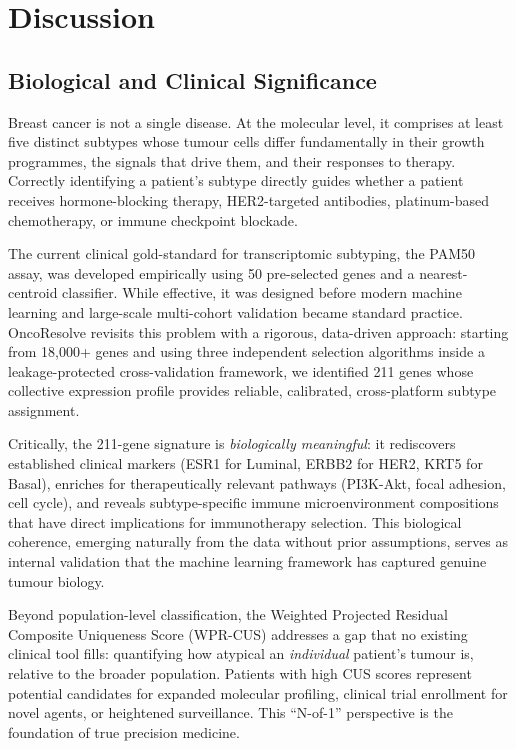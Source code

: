 \documentclass[10pt,a4paper,twocolumn]{article}
\begin{document}
\section{Discussion}

\subsection{Biological and Clinical Significance}

Breast cancer is not a single disease. At the molecular level, it comprises at least five distinct subtypes whose tumour cells differ fundamentally in their growth programmes, the signals that drive them, and their responses to therapy. Correctly identifying a patient's subtype directly guides whether a patient receives hormone-blocking therapy, HER2-targeted antibodies, platinum-based chemotherapy, or immune checkpoint blockade.

The current clinical gold-standard for transcriptomic subtyping, the PAM50 assay, was developed empirically using 50 pre-selected genes and a nearest-centroid classifier. While effective, it was designed before modern machine learning and large-scale multi-cohort validation became standard practice. OncoResolve revisits this problem with a rigorous, data-driven approach: starting from 18,000+ genes and using three independent selection algorithms inside a leakage-protected cross-validation framework, we identified 211 genes whose collective expression profile provides reliable, calibrated, cross-platform subtype assignment.

Critically, the 211-gene signature is \textit{biologically meaningful}: it rediscovers established clinical markers (ESR1 for Luminal, ERBB2 for HER2, KRT5 for Basal), enriches for therapeutically relevant pathways (PI3K-Akt, focal adhesion, cell cycle), and reveals subtype-specific immune microenvironment compositions that have direct implications for immunotherapy selection. This biological coherence, emerging naturally from the data without prior assumptions, serves as internal validation that the machine learning framework has captured genuine tumour biology.

Beyond population-level classification, the Weighted Projected Residual Composite Uniqueness Score (WPR-CUS) addresses a gap that no existing clinical tool fills: quantifying how atypical an \textit{individual} patient's tumour is, relative to the broader population. Patients with high CUS scores represent potential candidates for expanded molecular profiling, clinical trial enrollment for novel agents, or heightened surveillance. This ``N-of-1'' perspective is the foundation of true precision medicine.
\end{document}
